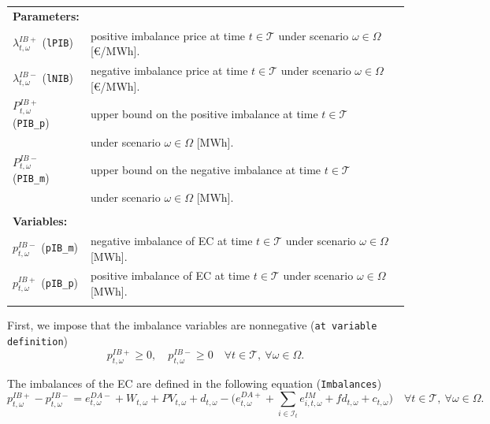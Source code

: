 \documentclass{article}
\begin{document}
\begin{tabularx}{\textwidth}{l l}
    \textbf{Parameters:} \\
    $\lambda^{IB+}_{t, \omega}$ (\verb|lPIB|) & positive imbalance price at time $t \in \mathcal{T}$ under scenario $\omega \in \Omega$ [\euro/MWh]. \\
	$\lambda^{IB-}_{t, \omega}$ (\verb|lNIB|) & negative imbalance price at time $t \in \mathcal{T}$ under scenario $\omega \in \Omega$ [\euro/MWh]. \\
    $P^{IB+}_{t, \omega}$ (\verb|PIB_p|) & upper bound on the positive imbalance at time $t \in \mathcal{T}$ \\
    & under scenario $\omega \in \Omega$ [MWh]. \\
	$P^{IB-}_{t, \omega}$ (\verb|PIB_m|) & upper bound on the negative imbalance at time $t \in \mathcal{T}$ \\ 
	& under scenario $\omega \in \Omega$ [MWh]. \\
    \\ 
       
    \textbf{Variables:} \\
    $p_{t, \omega}^{IB-}$ (\verb|pIB_m|) & negative imbalance of EC at time $t \in \mathcal{T}$ under scenario $\omega \in \Omega$ [MWh].	\\
	$p_{t, \omega}^{IB+}$ (\verb|pIB_p|) & positive imbalance of EC at time $t \in \mathcal{T}$ under scenario $\omega \in \Omega$ [MWh].	\\ 
    \\
\end{tabularx}

First, we impose that the imbalance variables are nonnegative (\verb|at variable definition|)
\begin{equation} \label{EQ:IBVarDef}
    p_{t, \omega}^{IB+} \geq 0, \quad p_{t, \omega}^{IB-} \geq 0 \quad \forall t \in \mathcal{T}, \ \forall \omega \in \Omega.
\end{equation}

The imbalances of the EC are defined in the following equation (\verb|Imbalances|)
\begin{equation} \label{EQ:IBDef}
    p^{IB+}_{t, \omega} - p^{IB-}_{t, \omega} = e^{DA-}_{t, \omega} + W_{t, \omega} + PV_{t, \omega} + d_{t, \omega} - \Big (e^{DA+}_{t, \omega} + \sum_{i \in \mathcal{I}_t} e^{IM}_{i, t, \omega} + fd_{t, \omega} + c_{t, \omega} \Big ) \quad \forall t \in \mathcal{T}, \ \forall \omega \in \Omega.
\end{equation}
\end{document}
